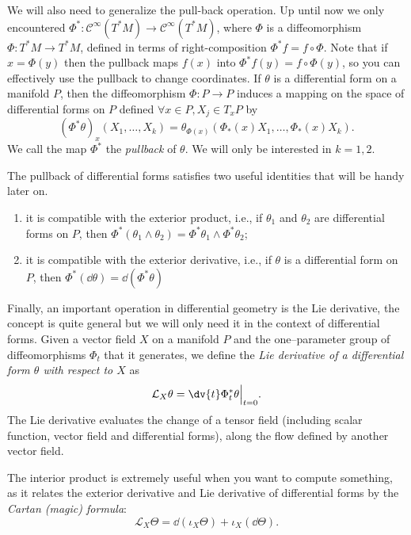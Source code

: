 \documentclass[english,fontsize=11pt,paper=b5]{scrbook}
\numberwithin{equation}{chapter}
\theoremstyle{definition}
\begin{document}
    We will also need to generalize the pull-back operation.
    Up until now we only encountered $\Phi^* : \mathcal{C}^\infty(T^*M) \to \mathcal{C}^\infty(T^*M)$, where $\Phi$ is a diffeomorphism $\Phi: T^*M \to T^*M$, defined in terms of right-composition $\Phi^* f = f \circ \Phi$.
    Note that if $x = \Phi(y)$ then the pullback maps $f(x)$ into $\Phi^* f (y) = f \circ \Phi (y)$, so you can effectively use the pullback to change coordinates.
    If $\theta$ is a differential form on a manifold $P$, then the diffeomorphism $\Phi : P \to P$ induces a mapping on the space of differential forms on $P$ defined $\forall x\in P, X_j\in T_xP$ by
    \begin{equation}
      (\Phi^{*}\theta)_{x}(X_{1},\ldots ,X_{k})=\theta_{\Phi(x)}(\Phi_*(x)X_{1},\ldots,\Phi_*(x)X_{k}).
    \end{equation}
    We call the map $\Phi^*$ the \emph{pullback} of $\theta$. We will only be interested in $k=1,2$.

    The pullback of differential forms satisfies two useful identities that will be handy later on.
    \begin{enumerate}
      \item it is compatible with the exterior product, i.e., if $\theta_1$ and $\theta_2$ are differential forms on $P$, then $\Phi^{*}(\theta_1 \wedge \theta_2) = \Phi^{*}\theta_1 \wedge \Phi^{*}\theta_2$;
      \item it is compatible with the exterior derivative, i.e., if $\theta$ is a differential form on $P$, then $\Phi^{*}(\dd\theta) = \dd(\Phi^{*}\theta)$
    \end{enumerate}

    Finally, an important operation in differential geometry is the Lie derivative, the concept is quite general but we will only need it in the context of differential forms.
    Given a vector field $X$ on a manifold $P$ and the one--parameter group of diffeomorphisms $\Phi_t$ that it generates, we define the \emph{Lie derivative of a differential form $\theta$ with respect to $X$} as
    \begin{equation}\label{eq:lie-derivative}
      \mathcal{L}_X \theta = \dv{t}\Phi_t^*\theta \Big|_{t=0}.
    \end{equation}
    The Lie derivative evaluates the change of a tensor field (including scalar function, vector field and differential forms), along the flow defined by another vector field.

    The interior product is extremely useful when you want to compute something, as it relates the exterior derivative and Lie derivative of differential forms by the \emph{Cartan (magic) formula}:
    \begin{equation}\label{eq:cartan}
      \mathcal{L}_X \Theta = \dd(\iota_X \Theta) + \iota_X (\dd{\Theta}).
    \end{equation}
\end{document}
